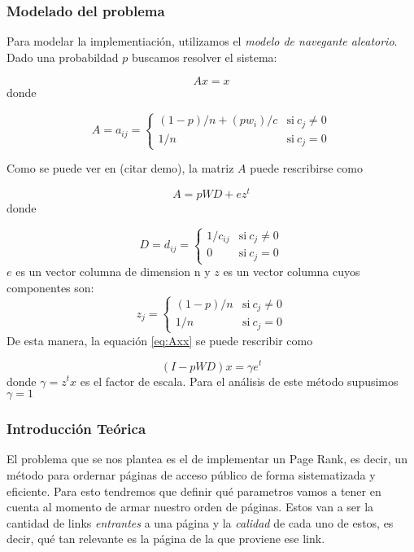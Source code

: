 \subsubsection*{Modelado del problema}
Para modelar la implementiaci\'on, utilizamos el \textit{modelo de navegante aleatorio}\cite{navegante}.
Dado una probabildad $p$ buscamos resolver el sistema:

\begin{equation}\label{eq:Axx}
    Ax = x
\end{equation}
donde 

\begin{equation}
 A = a_{ij} = \left\{
    \begin{array}{ll}
	 (1-p)/n + (p w_{i})/c & \mathrm{si\ } c_j\not=0\\
	 1/n & \mathrm{si\ } c_j=0
	 \end{array}
   \right.
\end{equation}

Como se puede ver en (citar demo), la matriz $A$ puede rescribirse como

\begin{equation}
    A = p WD + ez^{t}
\end{equation}
donde

\[
 D = d_{ij} = \left\{
    \begin{array}{ll}
	 1/c_{ij} & \mathrm{si\ } c_j\not=0\\
	 0 & \mathrm{si\ } c_j=0
	 \end{array}
   \right.
\]   
$e$ es un vector columna de dimension n y $z$ es un vector columna cuyos componentes son:
\[   
  z_{j} = \left\{
    \begin{array}{ll}
	 (1-p)/n & \mathrm{si\ } c_j\not=0\\
	 1/n & \mathrm{si\ } c_j=0
	 \end{array}
   \right.
\]  
De esta manera, la equaci\'on \ref{eq:Axx} se puede rescribir como

\begin{equation}\label{ipwd}
    (I - pWD)x = \gamma e^t 
\end{equation}
donde $\gamma = z^tx$ es el factor de escala. Para el an\'alisis de este m\'etodo supusimos
$\gamma = 1$


\subsubsection*{Introducción Teórica}

\par El problema que se nos plantea es el de implementar un Page Rank, es decir, 
un método para ordernar páginas de acceso público de forma sistematizada y eficiente. 
Para esto tendremos que definir qu\'e parametros vamos a tener en cuenta al momento de 
armar nuestro orden de páginas. Estos van a ser la cantidad de links \textit{entrantes} 
a una página y la \textit{calidad} de cada uno de estos, es decir, qu\'e tan relevante 
es la página de la que proviene ese link.\newline

